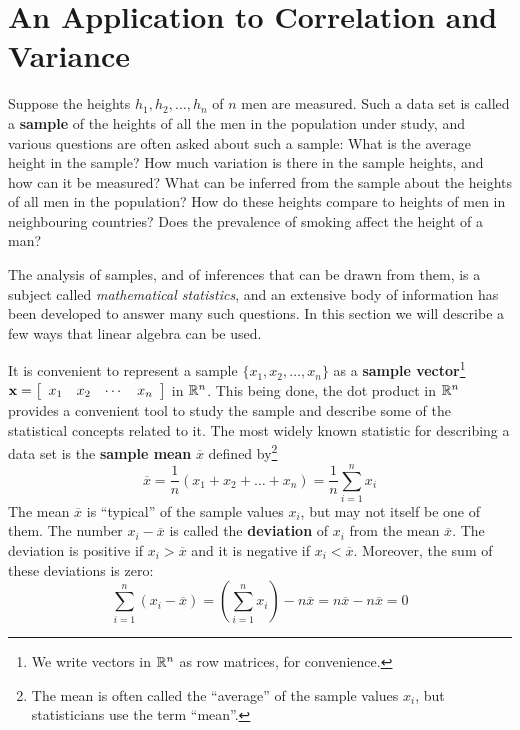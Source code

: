 \section{An Application to Correlation and Variance}
\label{sec:5_7}

Suppose the heights $h_{1}, h_{2}, \dots, h_{n}$ of $n$ men are measured. Such a data set is called a \textbf{sample} of the heights of all the men in the population under study, and various questions are often asked about such a sample: What is the average height in the sample? How much variation is there in the sample heights, and how can it be measured? What can be inferred from the sample about the heights of all men in the population? How do these heights compare to heights of men in neighbouring countries? Does the prevalence of smoking affect the height of a man?

The analysis of samples, and of inferences that can be drawn from them, is a subject called \textit{mathematical statistics}, and an extensive body of information has been developed to answer many such questions. In this section we will describe a few ways that linear algebra can be used.

It is convenient to represent a sample $\{x_{1}, x_{2}, \dots, x_{n}\}$ as a \textbf{sample vector}\footnote{We write vectors in $\mathbb{R}^n$ as row matrices, for convenience.}
$\textbf{x} = 
\left[ \begin{array}{cccc}
x_{1} & x_{2} & \cdots & x_{n}
\end{array} \right]$ in $\mathbb{R}^n$. This being done, the dot product in $\mathbb{R}^n$ provides a convenient tool to study the sample and describe some of the statistical concepts related to it. The most widely known statistic for describing a data set is the \textbf{sample mean} $\overline{x}$ defined by\footnote{The mean is often called the ``average'' of the sample values $x_{i}$, but statisticians use the term ``mean''.}
\begin{equation*}
\overline{x} = \frac{1}{n}(x_1 + x_2 + \dots + x_n) = \frac{1}{n}\sum_{i=1}^{n} x_i
\end{equation*}
The mean $\overline{x}$ is ``typical'' of the sample values $x_{i}$, but may not itself be one of them. The number $x_{i} - \overline{x}$ is called the \textbf{deviation} of $x_{i}$ from the mean $\overline{x}$. The deviation is positive if $x_{i} > \overline{x}$ and it is negative if $x_{i} < \overline{x}$. Moreover, the sum of these deviations is zero:
\begin{equation}
\label{eq:sum_of_deviations}
\sum_{i=1}^{n} (x_i - \overline{x}) = \left(\sum_{i=1}^{n} x_i\right) - n\overline{x} = n\overline{x} - n\overline{x} = 0
\end{equation}

